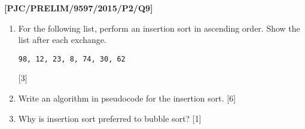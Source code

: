 \item \textbf{{[}PJC/PRELIM/9597/2015/P2/Q9{]} }
\begin{enumerate}
\item For the following list, perform an insertion sort in ascending order.
Show the list after each exchange.
\noindent \begin{center}
\texttt{98, 12, 23, 8, 74, 30, 62}
\par\end{center}

\hfill{}{[}3{]}
\item Write an algorithm in pseudocode for the insertion sort. \hfill{}{[}6{]}
\item Why is insertion sort preferred to bubble sort? \hfill{}{[}1{]}
\end{enumerate}